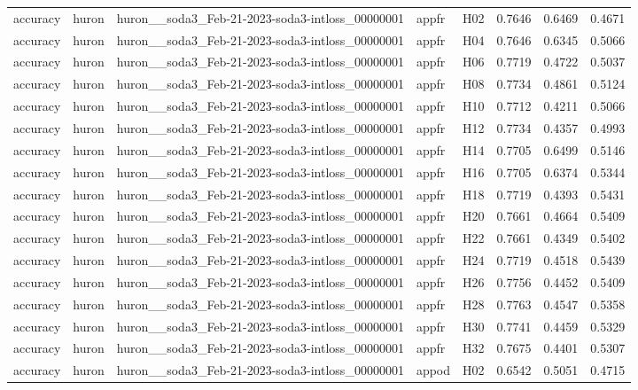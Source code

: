 \begin{table}[tbp]
\begin{tabular}{lllllrrr}
accuracy & huron & huron\_\_soda3\_Feb-21-2023-soda3-intloss\_00000001 & appfr & H02 & 0.7646 & 0.6469 & 0.4671 \\
accuracy & huron & huron\_\_soda3\_Feb-21-2023-soda3-intloss\_00000001 & appfr & H04 & 0.7646 & 0.6345 & 0.5066 \\
accuracy & huron & huron\_\_soda3\_Feb-21-2023-soda3-intloss\_00000001 & appfr & H06 & 0.7719 & 0.4722 & 0.5037 \\
accuracy & huron & huron\_\_soda3\_Feb-21-2023-soda3-intloss\_00000001 & appfr & H08 & 0.7734 & 0.4861 & 0.5124 \\
accuracy & huron & huron\_\_soda3\_Feb-21-2023-soda3-intloss\_00000001 & appfr & H10 & 0.7712 & 0.4211 & 0.5066 \\
accuracy & huron & huron\_\_soda3\_Feb-21-2023-soda3-intloss\_00000001 & appfr & H12 & 0.7734 & 0.4357 & 0.4993 \\
accuracy & huron & huron\_\_soda3\_Feb-21-2023-soda3-intloss\_00000001 & appfr & H14 & 0.7705 & 0.6499 & 0.5146 \\
accuracy & huron & huron\_\_soda3\_Feb-21-2023-soda3-intloss\_00000001 & appfr & H16 & 0.7705 & 0.6374 & 0.5344 \\
accuracy & huron & huron\_\_soda3\_Feb-21-2023-soda3-intloss\_00000001 & appfr & H18 & 0.7719 & 0.4393 & 0.5431 \\
accuracy & huron & huron\_\_soda3\_Feb-21-2023-soda3-intloss\_00000001 & appfr & H20 & 0.7661 & 0.4664 & 0.5409 \\
accuracy & huron & huron\_\_soda3\_Feb-21-2023-soda3-intloss\_00000001 & appfr & H22 & 0.7661 & 0.4349 & 0.5402 \\
accuracy & huron & huron\_\_soda3\_Feb-21-2023-soda3-intloss\_00000001 & appfr & H24 & 0.7719 & 0.4518 & 0.5439 \\
accuracy & huron & huron\_\_soda3\_Feb-21-2023-soda3-intloss\_00000001 & appfr & H26 & 0.7756 & 0.4452 & 0.5409 \\
accuracy & huron & huron\_\_soda3\_Feb-21-2023-soda3-intloss\_00000001 & appfr & H28 & 0.7763 & 0.4547 & 0.5358 \\
accuracy & huron & huron\_\_soda3\_Feb-21-2023-soda3-intloss\_00000001 & appfr & H30 & 0.7741 & 0.4459 & 0.5329 \\
accuracy & huron & huron\_\_soda3\_Feb-21-2023-soda3-intloss\_00000001 & appfr & H32 & 0.7675 & 0.4401 & 0.5307 \\
accuracy & huron & huron\_\_soda3\_Feb-21-2023-soda3-intloss\_00000001 & appod & H02 & 0.6542 & 0.5051 & 0.4715 \\

\end{tabular}
\end{table}
